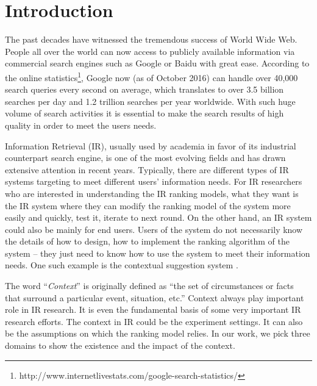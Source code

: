 %
%
\chapter{Introduction}
The past decades have witnessed the tremendous success of World Wide Web. 
People all over the world can now access to publicly available 
information via commercial search engines such as Google or Baidu 
with great ease. According to the online statistics\footnote{http://www.internetlivestats.com/google-search-statistics/}, 
Google now (as of October 2016) can handle over 40,000 search queries 
every second on average, which translates to over 3.5 billion searches 
per day and 1.2 trillion searches per year worldwide. 
With such huge volume of search activities it is essential to make the 
search results of high quality in order to meet the users needs.

Information Retrieval (IR), usually used by academia in favor of its 
industrial counterpart search engine, is one of the most evolving fields 
and has drawn extensive attention in recent years.
Typically, there are different types of IR systems targeting to meet 
different users' information needs. 
For IR researchers who are interested in understanding the IR ranking models, 
what they want is the IR system where they can modify the ranking model of 
the system more easily and quickly, test it, iterate to next round.
On the other hand, an IR system could also be mainly for end users. 
Users of the system do not necessarily know the details of how to design, 
how to implement the ranking algorithm of the system -- they just need to know 
how to use the system to meet their information needs. One such example is 
the contextual suggestion system \cite{udel:treccs2013,udel:treccs2014,udel:treccs2015,Yang:2013:OUP:2499178.2499191,Yang2015}.

The word ``\textit{Context}'' is originally defined as 
``the set of circumstances or facts that surround a particular event, situation, etc.''
Context always play important role in IR research. It is even the 
fundamental basis of some very important IR research efforts. 
The context in IR could be the experiment settings. 
It can also be the assumptions on which the ranking model relies. 
In our work, we pick three domains to show the existence and the impact of the context.

